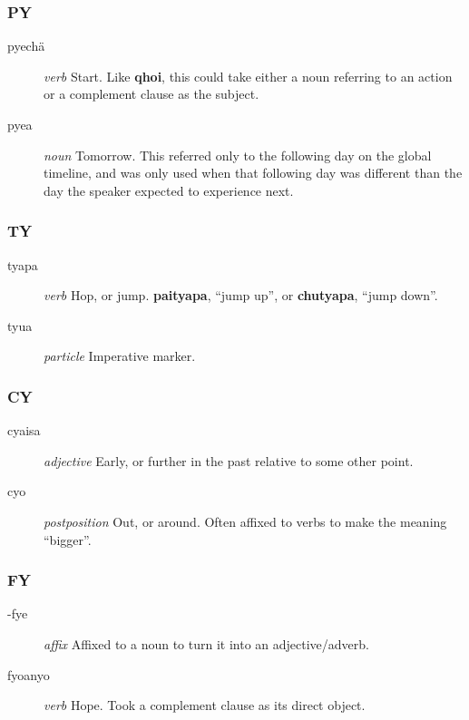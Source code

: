 \documentclass{article}
\begin{document}
\subsubsection{PY}

\begin{description}
\item [pyech\"a] \emph{verb} Start.  Like \textbf{qhoi}, this could take either a noun referring to an action or a complement clause as the subject.
\item [pyea] \emph{noun} Tomorrow.  This referred only to the following day on the global timeline, and was only used when that following day was different than the day the speaker expected to experience next.
\end{description}

\subsubsection{TY}

\begin{description}
\item [tyapa] \emph{verb} Hop, or jump.  \textbf{paityapa}, ``jump up'', or \textbf{chutyapa}, ``jump down''.
\item [tyua] \emph{particle} Imperative marker.
\end{description}

\subsubsection{CY}

\begin{description}
\item [cyaisa] \emph{adjective} Early, or further in the past relative to some other point.
\item [cyo] \emph{postposition} Out, or around.  Often affixed to verbs to make the meaning ``bigger''.
\end{description}

\subsubsection{FY}

\begin{description}
\item [-fye] \emph{affix} Affixed to a noun to turn it into an adjective/adverb.
\item [fyoanyo] \emph{verb} Hope.  Took a complement clause as its direct object.
\end{description}
\end{document}
